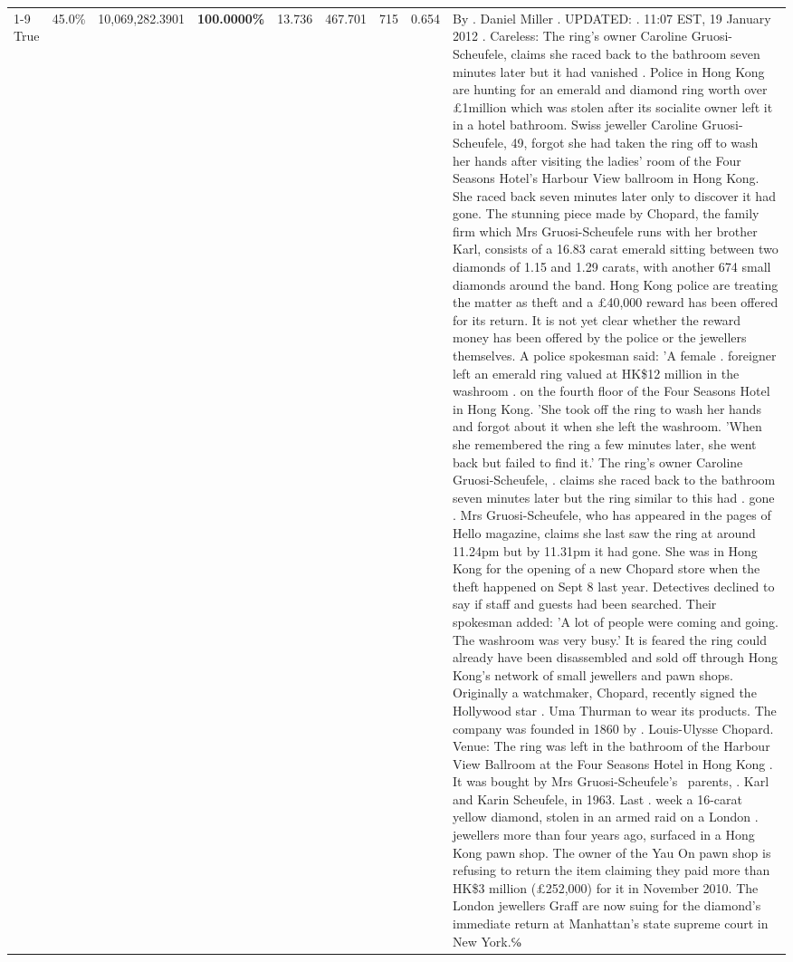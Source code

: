 \begin{table}[H]
\begin{tabular}{lllrlllll}
\cline{1-9}
True & 45.0\% & 10,069,282.3901 & \bfseries \color{red} 100.0000\% & 13.736 & 467.701 & 715 & 0.654 & By . Daniel Miller . UPDATED: . 11:07 EST, 19 January 2012 . Careless: The ring's owner Caroline Gruosi-Scheufele, claims she raced back to the bathroom seven minutes later but it had vanished . Police in Hong Kong are hunting for an emerald and diamond ring worth over £1million which was stolen after its socialite owner left it in a hotel bathroom. Swiss jeweller Caroline Gruosi-Scheufele, 49, forgot she had taken the ring off to wash her hands after visiting the ladies' room of the Four Seasons Hotel's Harbour View ballroom in Hong Kong. She raced back seven minutes later only to discover it had gone. The stunning piece made by Chopard, the family firm which Mrs Gruosi-Scheufele runs with her brother Karl, consists of a 16.83 carat emerald sitting between two diamonds of 1.15 and 1.29 carats, with another 674 small diamonds around the band. Hong Kong police are treating the matter as theft and a £40,000 reward has been offered for its return. It is not yet clear whether the reward money has been offered by the police or the jewellers themselves. A police spokesman said: 'A female . foreigner left an emerald ring valued at HK\$12 million in the washroom . on the fourth floor of the Four Seasons Hotel in Hong Kong. 'She took off the ring to wash her hands and forgot about it when she left the washroom. 'When she remembered the ring a few minutes later, she went back but failed to find it.' The ring's owner Caroline Gruosi-Scheufele, . claims she raced back to the bathroom seven minutes later but the ring similar to this had . gone . Mrs Gruosi-Scheufele, who has appeared in the pages of Hello magazine, claims she last saw the ring at around 11.24pm but by 11.31pm it had gone. She was in Hong Kong for the opening of a new Chopard store when the theft happened on Sept 8 last year. Detectives declined to say if staff and guests had been searched. Their spokesman added: 'A lot of people were coming and going. The washroom was very busy.' It is feared the ring could already have been disassembled and sold off through Hong Kong's network of small jewellers and pawn shops. Originally a watchmaker, Chopard, recently signed the Hollywood star . Uma Thurman to wear its products. The company was founded in 1860 by . Louis-Ulysse Chopard. Venue: The ring was left in the bathroom of the Harbour View Ballroom at the Four Seasons Hotel in Hong Kong . It was bought by Mrs Gruosi-Scheufele's  parents, . Karl and Karin Scheufele, in 1963. Last . week a 16-carat yellow diamond, stolen in an armed raid on a London . jewellers more than four years ago, surfaced in a Hong Kong pawn shop. The owner of the Yau On pawn shop is refusing to return the item claiming they paid more than HK\$3 million (£252,000) for it in November 2010. The London jewellers Graff are now suing for the diamond’s immediate return at Manhattan’s state supreme court in New York.℅ \\

\end{tabular}
\end{table}
